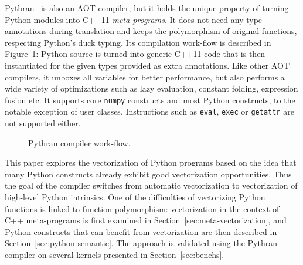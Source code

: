 \documentclass[preprint]{sigplanconf}
\begin{document}
Pythran~\cite{pythran2013, pyhpc2013} is also an AOT compiler, but it holds the
unique property of turning Python modules into C++11 \emph{meta-programs}. It
does not need any type annotations during translation and keeps the
polymorphism of original functions, respecting Python's duck typing. Its
compilation work-flow is described in Figure~\ref{fig:pythran-compiler}: Python
source is turned into generic C++11 code that is then instantiated for the
given types provided as extra annotations.  Like other AOT compilers, it
unboxes all variables for better performance, but also performs a wide variety
of optimizations such as lazy evaluation, constant folding, expression fusion
etc.  It supports core \texttt{numpy} constructs and most Python constructs, to
the notable exception of user classes. Instructions such as \texttt{eval},
\texttt{exec} or \texttt{getattr} are not supported either.

\begin{figure}

\centering
{}

\caption{Pythran compiler work-flow.}
\label{fig:pythran-compiler}
\end{figure}


This paper explores the vectorization of Python programs based on the idea that
many Python constructs already exhibit good vectorization opportunities. Thus
the goal of the compiler switches from automatic vectorization to vectorization
of high-level Python intrinsics. One of the difficulties of vectorizing Python
functions is linked to function polymorphism: vectorization in the context of
C++ meta-programs is first examined in Section~\ref{sec:meta-vectorization},
and Python constructs that can benefit from vectorization are then described in
Section~\ref{sec:python-semantic}. The approach is validated using the Pythran
compiler on several kernels presented in Section~\ref{sec:benchs}.
\end{document}
